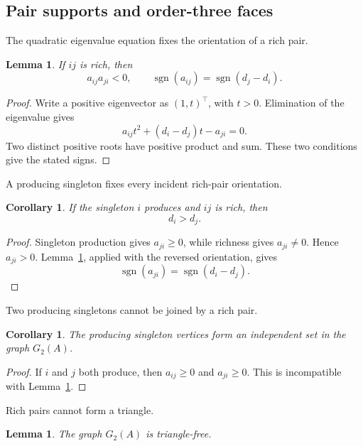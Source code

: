 \documentclass[11pt,a4paper]{article}
\newtheorem{lemma}[theorem]{Lemma}
\newtheorem{corollary}[theorem]{Corollary}
\theoremstyle{definition}
\DeclareMathOperator{\sgn}{sgn}
\begin{document}
\subsection{Pair supports and order-three faces}

The quadratic eigenvalue equation fixes the orientation of a rich pair.

\begin{lemma}
\label{lem:pair-orientation}
If $ij$ is rich, then
$$
a_{ij}a_{ji}<0,
\qquad
\sgn(a_{ij})=\sgn(d_j-d_i).
$$
\end{lemma}

\begin{proof}
Write a positive eigenvector as $(1,t)^\top$, with $t>0$. Elimination
of the eigenvalue gives
$$
a_{ij}t^2+(d_i-d_j)t-a_{ji}=0.
$$
Two distinct positive roots have positive product and sum. These two
conditions give the stated signs.
\end{proof}

A producing singleton fixes every incident rich-pair orientation.

\begin{corollary}
\label{cor:singleton-orientation}
If the singleton $i$ produces and $ij$ is rich, then
$$
d_i>d_j.
$$
\end{corollary}

\begin{proof}
Singleton production gives $a_{ji}\geq0$, while richness gives
$a_{ji}\neq0$. Hence $a_{ji}>0$.
Lemma~\ref{lem:pair-orientation}, applied with the reversed orientation,
gives
$$
\sgn(a_{ji})=\sgn(d_i-d_j).
$$
\end{proof}

Two producing singletons cannot be joined by a rich pair.

\begin{corollary}
\label{cor:singleton-independent}
The producing singleton vertices form an independent set in the
graph $G_2(A)$.
\end{corollary}

\begin{proof}
If $i$ and $j$ both produce, then $a_{ij}\geq0$ and $a_{ji}\geq0$.
This is incompatible with Lemma~\ref{lem:pair-orientation}.
\end{proof}

Rich pairs cannot form a triangle.

\begin{lemma}
\label{lem:triangle-free}
The graph $G_2(A)$ is triangle-free.
\end{lemma}
\end{document}
